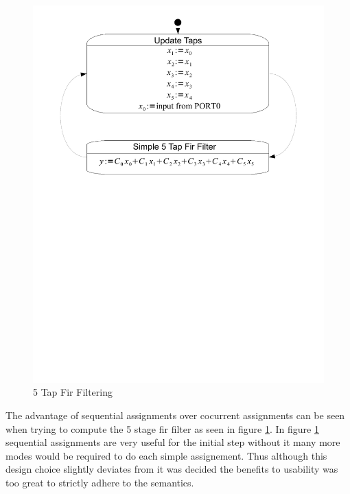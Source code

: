 \begin{figure}[htp]
    \centering
    \includegraphics[trim= 10mm 145mm 10mm 10mm, clip, width=\imgmedium]{./images/state_uml2_fir.pdf}
    \caption{5 Tap Fir Filtering}
    \label{fig:state_uml2_fir}
\end{figure}

The advantage of sequential assignments over cocurrent assignments can be seen when trying to compute the 5 stage fir filter as seen in figure \ref{fig:state_uml2_fir}. In figure \ref{fig:state_uml2_fir} sequential assignments are very useful for the initial step without it many more modes would be required to do each simple assignement. Thus although this design choice slightly deviates from \cite{UML2} it was decided the benefits to usability was too great to strictly adhere to the \cite{UML2} semantics.

